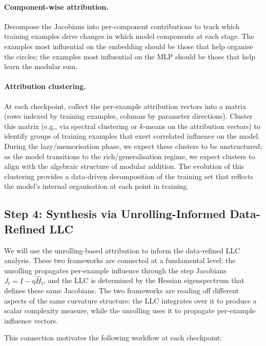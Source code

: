 \documentclass[11pt,a4paper]{article}
\begin{document}
\paragraph{Component-wise attribution.} Decompose the Jacobians into per-component contributions to track which training examples drive changes in which model components at each stage. The examples most influential on the embedding should be those that help organise the circles; the examples most influential on the MLP should be those that help learn the modular sum.

\paragraph{Attribution clustering.} At each checkpoint, collect the per-example attribution vectors into a matrix (rows indexed by training examples, columns by parameter directions). Cluster this matrix (e.g., via spectral clustering or $k$-means on the attribution vectors) to identify groups of training examples that exert correlated influence on the model. During the lazy/memorisation phase, we expect these clusters to be unstructured; as the model transitions to the rich/generalisation regime, we expect clusters to align with the algebraic structure of modular addition. The evolution of this clustering provides a data-driven decomposition of the training set that reflects the model's internal organisation at each point in training.

\subsection{Step 4: Synthesis via Unrolling-Informed Data-Refined LLC}\label{sec:synthesis}

We will use the unrolling-based attribution to inform the data-refined LLC analysis. These two frameworks are connected at a fundamental level: the unrolling propagates per-example influence through the step Jacobians $J_t = I - \eta \hat{H}_t$, and the LLC is determined by the Hessian eigenspectrum that defines these same Jacobians. The two frameworks are reading off different aspects of the same curvature structure: the LLC integrates over it to produce a scalar complexity measure, while the unrolling uses it to propagate per-example influence vectors.

This connection motivates the following workflow at each checkpoint:
\end{document}
